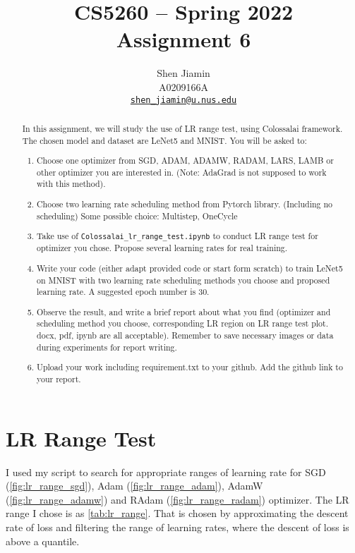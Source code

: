 \documentclass{article}
\title{\sffamily\bfseries
  CS5260 -- Spring 2022 \\
  Assignment 6
}
\author{
  Shen Jiamin \\
  A0209166A \\
  \href{mailto:shen_jiamin@u.nus.edu}{\nolinkurl{shen_jiamin@u.nus.edu}}
}
\date{}
\begin{document}
\maketitle

\begin{abstract}

    In this assignment, we will study the use of LR range test, using
    Colossalai framework. The chosen model and dataset are LeNet5 and
    MNIST. You will be asked to:
    \begin{enumerate}
        \item Choose one optimizer from SGD, ADAM, ADAMW, RADAM,
              LARS, LAMB or other optimizer you are interested in. (Note: AdaGrad
              is not supposed to work with this method).
        \item Choose two learning rate scheduling method from Pytorch library.
              (Including no scheduling) Some possible choice: Multistep, OneCycle
        \item Take use of \nolinkurl{Colossalai_lr_range_test.ipynb} to conduct LR range test
              for optimizer you chose. Propose several learning rates for real training.
        \item Write your code (either adapt provided code or start form scratch) to
              train LeNet5 on MNIST with two learning rate scheduling methods you
              choose and proposed learning rate. A suggested epoch number is 30.
        \item Observe the result, and write a brief report about what you find
              (optimizer and scheduling method you choose, corresponding LR region
              on LR range test plot. docx, pdf, ipynb are all acceptable). Remember to
              save necessary images or data during experiments for report writing.
        \item Upload your work including requirement.txt to your github. Add the
              github link to your report.
    \end{enumerate}

\end{abstract}


\section{LR Range Test}

I used my script to search for appropriate ranges of learning rate for
SGD (\autoref{fig:lr_range_sgd}),
Adam (\autoref{fig:lr_range_adam}),
AdamW (\autoref{fig:lr_range_adamw}) and
RAdam (\autoref{fig:lr_range_radam}) optimizer.
The LR range I chose is as \autoref{tab:lr_range}.
That is chosen by approximating the descent rate of loss and filtering the range of learning rates, where the descent of loss is above a quantile.
\end{document}
